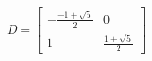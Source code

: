 \documentclass[preview]{standalone}
\begin{document}
\begin{center}
$$D = \begin{bmatrix} - \frac{-1 + \sqrt{5}}{2} &  0 \\ 1 & \frac{1 + \sqrt{5}}{2} \end{bmatrix}$$
\end{center}
\end{document}
